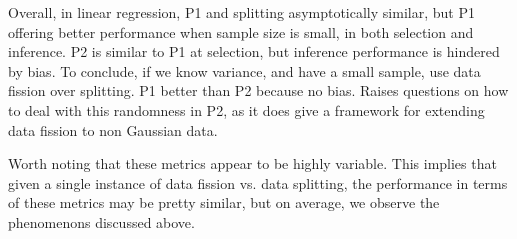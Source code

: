 
Overall, in linear regression, P1 and splitting asymptotically similar, but P1 offering better performance when sample size is small, in both selection and inference. P2 is similar to P1 at selection, but inference performance is hindered by bias. To conclude, if we know variance, and have a small sample, use data fission over splitting. P1 better than P2 because no bias. Raises questions on how to deal with this randomness in P2, as it does give a framework for extending data fission to non Gaussian data.

Worth noting that these metrics appear to be highly variable. This implies that given a single instance of data fission vs. data splitting, the performance in terms of these metrics may be pretty similar, but on average, we observe the phenomenons discussed above.

